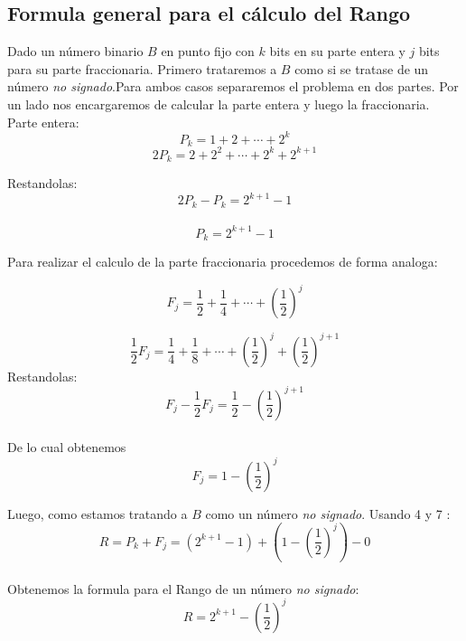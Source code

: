 \subsection{Formula general para el c\'alculo del Rango}
\indent\indent Dado un n\'umero binario $B$ en punto fijo con $k$ bits en su parte entera y $j$ bits para su parte fraccionaria. 
 Primero trataremos a $B$ como si se tratase de un n\'umero \textit{no signado}.Para ambos casos separaremos el problema en dos partes. Por un lado nos encargaremos de calcular la parte entera y luego la fraccionaria.
\\

Parte entera:
\begin{equation}
P_{k} = 1 + 2 +  \cdots  + 2^k
\end{equation}
\begin{equation}
2P_{k} = 2 + 2^2  + \cdots + 2^k +2^{k+1} 
\end{equation}

Restandolas:
\begin{equation}
2P_{k} - P_{k} = 2^{k+1} -1 
\end{equation}
\\
\begin{equation}
P_{k} = 2^{k+1}-1
\end{equation}

Para realizar el calculo de la parte fraccionaria procedemos de forma analoga:

\begin{equation}
F_{j} = \frac{1}{2} + \frac{1}{4} +  \cdots  + \left(\frac{1}{2}\right)^j
\end{equation}

\begin{equation}
\frac{1}{2} F_{j} = \frac{1}{4} + \frac{1}{8} +  \cdots  + \left(\frac{1}{2}\right)^j + \left(\frac{1}{2}\right)^{j+1}
\end{equation}
Restandolas:
\begin{equation}
F_{j} - \frac{1}{2}  F_{j} = \frac{1}{2} - \left(\frac{1}{2}\right)^{j+1}
\end{equation}
\\
De lo cual obtenemos
\begin{equation}
F_{j} = 1 - \left(\frac{1}{2}\right)^j
\end{equation}

Luego, como estamos tratando a $B$ como un n\'umero \textit{no signado}. 
Usando 4 y 7 :
$$R = P_{k}  + F_{j} =  \left(2^{k+1}-1 \right) + \left(1 - \left(\frac{1}{2} \right)^j\right) - 0$$
\\
Obtenemos la formula para el Rango de un n\'umero \textit{no signado}:
$$R =  2^{k+1} - \left(\frac{1}{2} \right)^j$$


